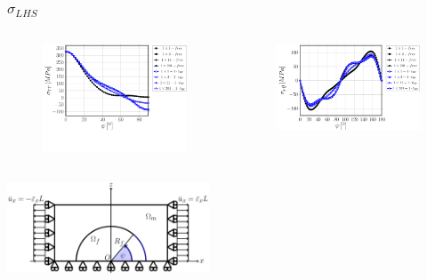\documentclass[first,firstsupp,lastsupp,last,hyperref,table]{ETHclass}
\begin{document}
\begin{frame}
\frametitle{\vspace{0.2cm}\small $\sigma_{LHS}$}
\vspace{-.75cm}
\centering
\begin{columns}[c]
\centering
\begin{column}{0.5\textwidth}
\centering
\begin{figure}
\centering
\includegraphics[width=\columnwidth]{vf60-nodamage-sigmar-notol.pdf}
\end{figure}
\end{column}
\begin{column}{0.5\textwidth}
\centering
\begin{figure}
\centering
\includegraphics[width=\columnwidth]{vf60-nodamage-taurt.pdf}
\end{figure}
\end{column}
\end{columns}
\vspace{-0.25cm}
\includegraphics[width=0.45\textwidth]{refAngle.pdf}
\end{frame}
\end{document}
